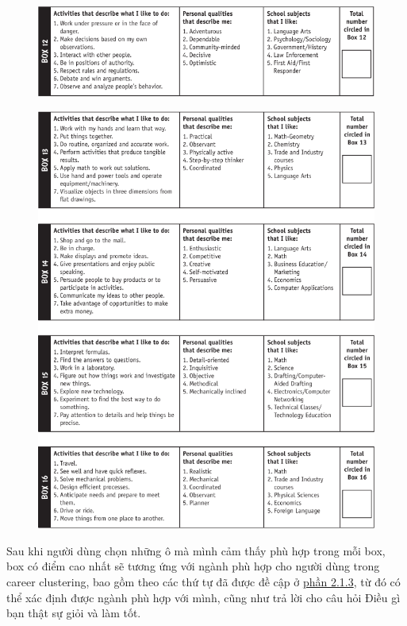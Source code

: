 \begin{figure}[H]
    \centering
    \includegraphics[width=0.9\linewidth]{images/CC4.png}
\end{figure}

\begin{figure}[H]
    \centering
    \includegraphics[width=0.9\linewidth,height= 0.8\textheight]{images/CC5.png}
\end{figure}

Sau khi người dùng chọn những ô mà mình cảm thấy phù hợp trong mỗi box, box có điểm cao nhất sẽ tương ứng với ngành phù hợp cho người dùng trong career clustering, bao gồm theo các thứ tự đã được đề cập ở \hyperref[2.1.3]{phần 2.1.3}, từ đó có thể xác định được ngành phù hợp với mình, cũng như trả lời cho câu hỏi Điều gì bạn thật sự giỏi và làm tốt.